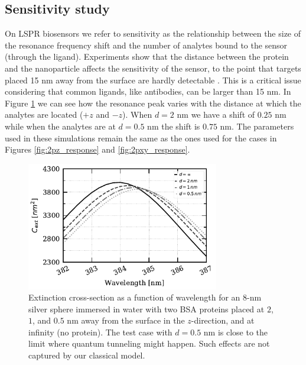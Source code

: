 \subsection{Sensitivity study} \label{sec:sensitivity}

On LSPR biosensors we refer to sensitivity as the relationship between the size of the 
resonance frequency shift and the number of analytes bound to the sensor (through the 
ligand). Experiments show that the distance between the protein and the nanoparticle 
affects the sensitivity of the sensor, to the point that targets placed 15 nm away 
from the surface are hardly detectable \cite{HaesETal2004}. This is a critical issue
considering that common ligands, like antibodies, can be larger than 15 nm. In 
Figure \ref{fig:dist_response} we can see how the resonance peak varies with the distance 
at which the  analytes are located ($+z$ and $-z$). When $d=2$ nm we have a shift of 
$0.25$ nm while when the analytes are at $d=0.5$ nm the shift is $0.75$ nm. The parameters
used in these simulations remain the same as the ones used for the cases in Figures 
\ref{fig:2pz_response} and \ref{fig:2pxy_response}.

\begin{figure}[h] %
    \centering
    \includegraphics[width=0.75\textwidth]{2pz_lspr_response.pdf} 
    \caption{Extinction cross-section as a function of wavelength for an $8$-nm
             silver sphere immersed in water with two BSA proteins placed at
             $2$, $1$, and $0.5$ nm away from the surface in the 
             $z$-direction, and at infinity (no protein). The test case with
             $d=0.5$ nm is close to the limit where quantum tunneling might happen. 
             Such effects are not captured by our classical model.}
    \label{fig:dist_response}
 \end{figure}

